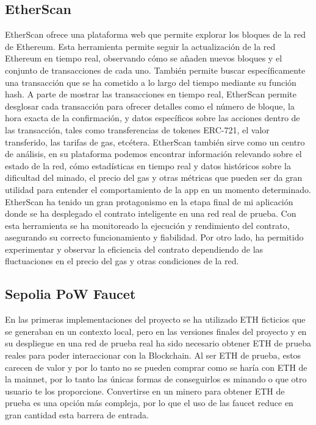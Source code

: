 \subsection{EtherScan}

EtherScan ofrece una plataforma web que permite explorar los bloques de la red de Ethereum.
Esta herramienta permite seguir la actualización de la red Ethereum en tiempo real, observando cómo se añaden nuevos bloques y el conjunto de transacciones de cada uno. También permite buscar específicamente una transacción que se ha cometido a lo largo del tiempo mediante su función hash.
A parte de mostrar las transacciones en tiempo real, EtherScan permite desglosar cada transacción para ofrecer detalles como el número de bloque, la hora exacta de la confirmación, y datos específicos sobre las acciones dentro de las transacción, tales como transferencias de tokenes ERC-721, el valor transferido, las tarifas de gas, etcétera.
EtherScan también sirve como un centro de análisis, en su plataforma podemos encontrar información relevando sobre el estado de la red, cómo estadísticas en tiempo real y datos históricos sobre la dificultad del minado, el precio del gas y otras métricas que pueden ser da gran utilidad para entender el comportamiento de la app en un momento determinado.
EtherScan ha tenido un gran protagonismo en la etapa final de mi aplicación donde se ha desplegado el contrato inteligente en una red real de prueba.
Con esta herramienta se ha monitoreado la ejecución y rendimiento del contrato, asegurando su correcto funcionamiento y fiabilidad.
Por otro lado, ha permitido experimentar y observar la eficiencia del contrato dependiendo de las fluctuaciones en el precio del gas y otras condiciones de la red.


\subsection{Sepolia PoW Faucet}

En las primeras implementaciones del proyecto se ha utilizado ETH ficticios que se generaban en un contexto local, pero en las versiones finales del proyecto y en su despliegue en una red de prueba real ha sido necesario obtener ETH de prueba reales para poder interaccionar con la Blockchain.
Al ser ETH de prueba, estos carecen de valor y por lo tanto no se pueden comprar como se haría con ETH de la mainnet, por lo tanto las únicas formas de conseguirlos es minando o que otro usuario te los proporcione.
Convertirse en un minero para obtener ETH de prueba es una opción más compleja, por lo que el uso de las faucet reduce en gran cantidad esta barrera de entrada.

